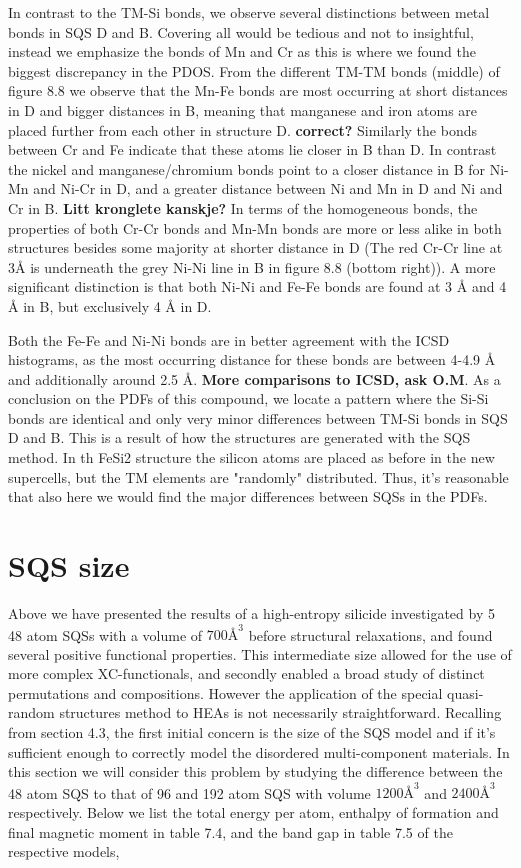 In contrast to the TM-Si bonds, we observe several distinctions between metal bonds in SQS D and B. Covering all would be tedious and not to insightful, instead we emphasize the bonds of Mn and Cr as this is where we found the biggest discrepancy in the PDOS. From the different TM-TM bonds (middle) of figure 8.8 we observe that the Mn-Fe bonds are most occurring at short distances in D and bigger distances in B, meaning that manganese and iron atoms are placed further from each other in structure D. \textbf{correct?} Similarly the bonds between Cr and Fe   indicate that these atoms lie closer in B than D. In contrast the nickel and manganese/chromium bonds point to a closer distance in B for Ni-Mn and Ni-Cr in D, and a greater distance between Ni and Mn in D and Ni and Cr in B. \textbf{Litt kronglete kanskje?} In terms of the homogeneous bonds, the properties of both Cr-Cr bonds and Mn-Mn bonds are more or less alike in both structures besides some majority at shorter distance in D (The red Cr-Cr line at 3Å is underneath the grey Ni-Ni line in B in figure 8.8 (bottom right)). A more significant distinction is that both Ni-Ni and Fe-Fe bonds are found at 3 Å and 4 Å in B, but exclusively 4 Å in D.    

Both the Fe-Fe and Ni-Ni bonds are in better agreement with the ICSD histograms, as the most occurring distance for these bonds are between 4-4.9 Å and additionally around 2.5 Å. \textbf{More comparisons to ICSD, ask O.M}. As a conclusion on the PDFs of this compound, we locate a pattern where the Si-Si bonds are identical and only very minor differences between TM-Si bonds in SQS D and B. This is a result of how the structures are generated with the SQS method. In th FeSi2 structure the silicon atoms are placed as before in the new supercells, but the TM elements are "randomly" distributed. Thus, it's reasonable that also here we would find the major differences between SQSs in the PDFs. 

\newpage
\section{SQS size}
Above we have presented the results of a high-entropy silicide  investigated by 5 48 atom SQSs with a volume of $700 Å^3$ before structural relaxations, and found several positive functional properties. This intermediate size allowed for the use of more complex XC-functionals, and secondly enabled a broad study of distinct permutations and compositions. However the application of the special quasi-random structures method to HEAs is not necessarily straightforward. Recalling from section 4.3, the first initial concern is the size of the SQS model and if it's sufficient enough to correctly model the disordered multi-component materials. In this section we will consider this problem by studying the difference between the 48 atom SQS to that of 96 and 192 atom SQS with volume $1200 Å^3$ and $2400 Å^3$ respectively. Below we list the total energy per atom, enthalpy of formation and final magnetic moment in table 7.4, and the band gap in table 7.5 of the respective models, 

